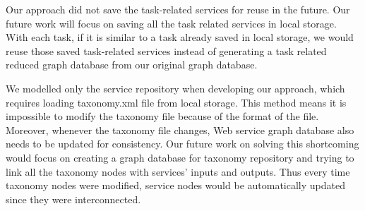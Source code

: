 Our approach did not save the task-related services for reuse in the future. Our future work will focus on saving all the task related services in local storage. With each task, if it is similar to a task already saved in local storage, we would reuse those saved task-related services instead of generating a task related reduced graph database from our original graph database. \par

We modelled only the service repository when developing our approach, which requires loading taxonomy.xml file from local storage. This method means it is impossible to modify the taxonomy file because of the format of the file. Moreover, whenever the taxonomy file changes, Web service graph database also needs to be updated for consistency.  Our future work on solving this shortcoming would focus on creating a graph database for taxonomy repository and trying to link all the taxonomy nodes with services' inputs and outputs. Thus every time taxonomy nodes were modified, service nodes would be automatically updated since they were interconnected. \par
